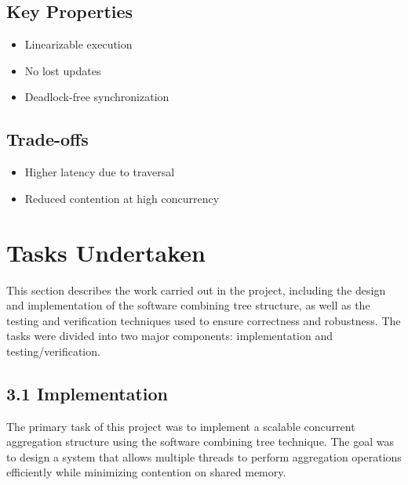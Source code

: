 \documentclass[11pt,a4paper]{article}
\begin{document}
\subsection{Key Properties}

\begin{itemize}
    \item Linearizable execution
    \item No lost updates
    \item Deadlock-free synchronization
\end{itemize}

\subsection{Trade-offs}

\begin{itemize}
    \item Higher latency due to traversal
    \item Reduced contention at high concurrency
\end{itemize}


\section{Tasks Undertaken}
\label{sec:tasks}
This section describes the work carried out in the project, including the design and implementation of the software combining tree structure, as well as the testing and verification techniques used to ensure correctness and robustness. The tasks were divided into two major components: implementation and testing/verification.

\subsection*{3.1 Implementation}

The primary task of this project was to implement a scalable concurrent aggregation structure using the software combining tree technique. The goal was to design a system that allows multiple threads to perform aggregation operations efficiently while minimizing contention on shared memory.
\end{document}
